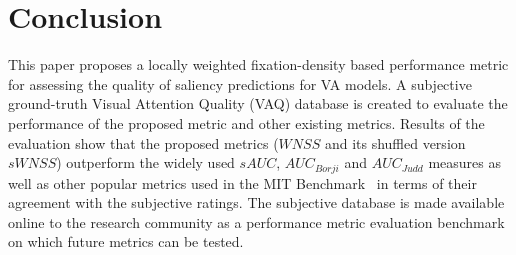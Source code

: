 \documentclass[12pt,onecolumn,journal,	draftclsnofoot]{IEEEtran}
\begin{document}


\section{Conclusion}
\label{sec:conclusion}
This paper proposes a locally weighted fixation-density based performance metric for assessing the quality of saliency predictions for VA models.  A subjective ground-truth Visual Attention Quality (VAQ) database is created to evaluate the performance of the proposed metric and other existing metrics.  Results of the evaluation show that the proposed metrics ($WNSS$ and its shuffled version $sWNSS$) outperform the widely used $sAUC$, $AUC_{Borji}$ and $AUC_{Judd}$ measures as well as other popular metrics used in the MIT Benchmark~\cite{mit-saliency-benchmark} in terms of their agreement with the subjective ratings. The subjective database is made available online to the research community as a performance metric evaluation benchmark on which future metrics can be tested.

%
\end{document}
